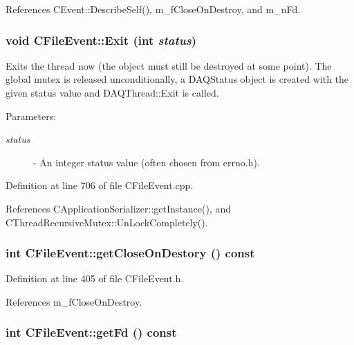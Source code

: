 References CEvent::Describe\-Self(), m\_\-f\-Close\-On\-Destroy, and m\_\-n\-Fd.
\subsubsection{\setlength{\rightskip}{0pt plus 5cm}void CFile\-Event::Exit (int {\em status})\hspace{0.3cm}{\tt  [protected]}}\label{classCFileEvent_b0}


Exits the thread now (the object must still be destroyed at some point). The global mutex is released unconditionally, a DAQStatus object is created with the given status value and DAQThread::Exit is called.\begin{Desc}
\item[Parameters: ]\par
\begin{description}
\item[{\em 
status}]- An integer status value (often chosen from errno.h). \end{description}
\end{Desc}


Definition at line 706 of file CFile\-Event.cpp.

References CApplication\-Serializer::get\-Instance(), and CThread\-Recursive\-Mutex::Un\-Lock\-Completely().
\subsubsection{\setlength{\rightskip}{0pt plus 5cm}int CFile\-Event::get\-Close\-On\-Destory () const\hspace{0.3cm}{\tt  [inline]}}\label{classCFileEvent_a11}




Definition at line 405 of file CFile\-Event.h.

References m\_\-f\-Close\-On\-Destroy.
\subsubsection{\setlength{\rightskip}{0pt plus 5cm}int CFile\-Event::get\-Fd () const\hspace{0.3cm}{\tt  [inline]}}\label{classCFileEvent_a10}





